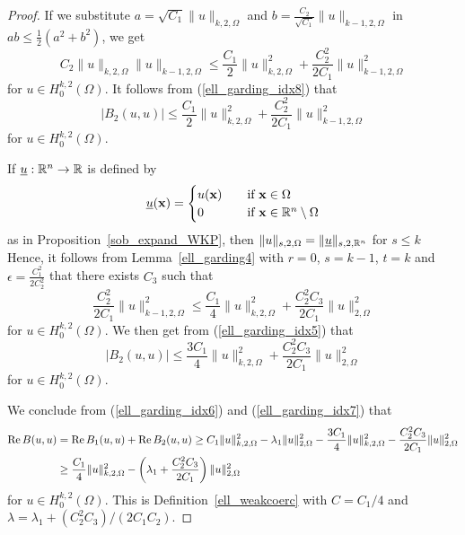 \begin{proof}
If we substitute $a= \sqrt{C_1} \|u\|_{k,2,\Omega}$ and
$\displaystyle b = \frac{C_2}{\sqrt{C_1}}\|u\|_{k-1,2,\Omega}$ in
$\displaystyle ab \leq \frac{1}{2}(a^2+b^2)$, we get
\[
C_2\|u\|_{k,2,\Omega} \|u\|_{k-1,2,\Omega}
\leq \frac{C_1}{2} \|u\|_{k,2,\Omega}^2 + \frac{C_2^2}{2C_1}\|u\|_{k-1,2,\Omega}^2
\]
for $\displaystyle u \in H^{k,2}_0(\Omega)$.  It follows from
(\ref{ell_garding_idx8}) that
\begin{equation} \label{ell_garding_idx5}
\left|B_2(u,u)\right|
\leq \frac{C_1}{2} \|u\|_{k,2,\Omega}^2 + \frac{C_2^2}{2C_1}\|u\|_{k-1,2,\Omega}^2
\end{equation}
for $\displaystyle u \in H^{k,2}_0(\Omega)$.

If $\underline{u}:\mathbb{R}^n\rightarrow \mathbb{R}$ is defined by
\[
\underline{u}(\mathbf{x}) =
\begin{cases}
u(\mathbf{x}) & \quad \text{if} \ \mathbf{x} \in \Omega \\
0 & \quad \text{if} \ \mathbf{x} \in \mathbb{R}^n \setminus \Omega
\end{cases}
\]
as in Proposition~\ref{sob_expand_WKP}, then
$\|u\|_{s,2,\Omega} = \|\underline{u}\|_{s,2,\mathbb{R}^n}$ for $s\leq k$
Hence, it follows from Lemma~\ref{ell_garding4} with $r=0$, $s=k-1$, $t=k$
and $\displaystyle \epsilon = \frac{C_1^2}{2C_2^2}$ that
there exists $C_3$ such that
\[
\frac{C_2^2}{2C_1}\|u\|_{k-1,2,\Omega}^2 \leq 
\frac{C_1}{4} \|u\|_{k,2,\Omega}^2 + \frac{C_2^2 C_3}{2C_1}
\|u\|_{2,\Omega}^2
\]
for $\displaystyle u \in H^{k,2}_0(\Omega)$.  We then get from
(\ref{ell_garding_idx5}) that
\begin{equation} \label{ell_garding_idx7}
\left|B_2(u,u)\right| \leq \frac{3C_1}{4} \|u\|_{k,2,\Omega}^2
 + \frac{C_2^2C_3}{2C_1}\|u\|_{2,\Omega}^2
\end{equation}
for $\displaystyle u \in H^{k,2}_0(\Omega)$.

We conclude from (\ref{ell_garding_idx6}) and (\ref{ell_garding_idx7}) that
\begin{align*}
\operatorname{Re} B(u,u) &= \operatorname{Re} B_1(u,u) + \operatorname{Re} B_2(u,u) \geq
C_1\|u\|_{k,2,\Omega}^2 - \lambda_1 \|u\|_{2,\Omega}^2 - 
\frac{3C_1}{4} \|u\|_{k,2,\Omega}^2 - \frac{C_2^2C_3}{2C_1}\|u\|_{2,\Omega}^2 \\
&\geq \frac{C_1}{4} \|u\|_{k,2,\Omega}^2 - \left(\lambda_1 +
\frac{C_2^2C_3}{2C_1}\right) \|u\|_{2,\Omega}^2
\end{align*}
for $\displaystyle u \in H^{k,2}_0(\Omega)$.
This is Definition~\ref{ell_weakcoerc} with $C=C_1/4$ and
$\lambda = \lambda_1 + (C_2^2 C_3)/(2C_1C_2)$.
\end{proof}

